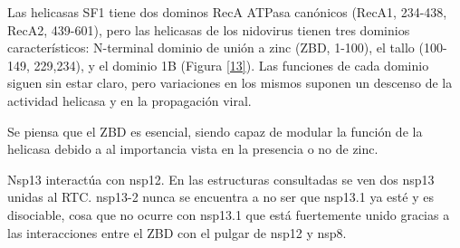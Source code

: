 \documentclass[a4paper,11pt]{report}
\begin{document}
Las helicasas SF1 tiene dos dominos RecA ATPasa canónicos (RecA1, 234-438, RecA2, 439-601), pero las helicasas de los nidovirus tienen tres dominios característicos: N-terminal dominio de unión a zinc (ZBD, 1-100), el tallo (100-149, 229,234), y el dominio 1B (Figura \ref{13}). Las funciones de cada dominio siguen sin estar claro, pero variaciones en los mismos suponen un descenso de la actividad helicasa y en la propagación viral. 

Se piensa que el ZBD es esencial, siendo capaz de modular la función de la helicasa debido a al importancia vista en la presencia o no de zinc.

Nsp13 interactúa con nsp12. En las estructuras consultadas se ven dos nsp13 unidas al RTC. nsp13-2 nunca se encuentra a no ser que nsp13.1 ya esté y es disociable, cosa que no ocurre con nsp13.1 que está fuertemente unido gracias a las interacciones entre el ZBD con el pulgar de nsp12 y nsp8. 
\end{document}
